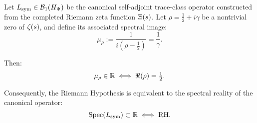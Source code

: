 \begin{lemma}
\label{lem_reality_of_spectrum_and_rh}

Let \( L_{\mathrm{sym}} \in \mathcal{B}_1(H_{\Psi}) \) be the canonical self-adjoint trace-class operator constructed from the completed Riemann zeta function \( \Xi(s) \). Let \( \rho = \tfrac{1}{2} + i\gamma \) be a nontrivial zero of \( \zeta(s) \), and define its associated spectral image:
\[
\mu_\rho := \frac{1}{i(\rho - \tfrac{1}{2})} = \frac{1}{\gamma}.
\]

Then:
\[
\mu_\rho \in \mathbb{R} \iff \Re(\rho) = \tfrac{1}{2}.
\]

\medskip

\noindent
Consequently, the Riemann Hypothesis is equivalent to the spectral reality of the canonical operator:
\[
\operatorname{Spec}(L_{\mathrm{sym}}) \subset \mathbb{R} \iff \mathrm{RH}.
\]
\end{lemma}
